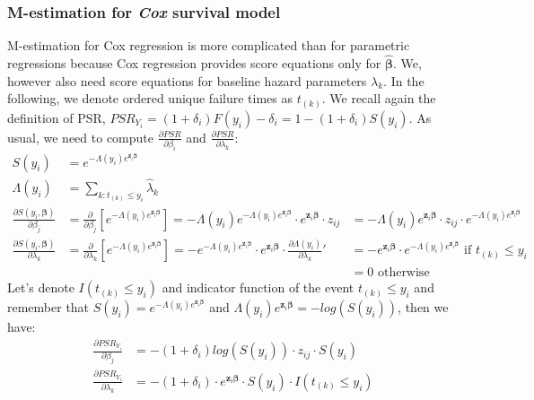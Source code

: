 \documentclass[]{article}
\begin{document}
\subsubsection{M-estimation for \emph{Cox} survival model}
M-estimation for Cox regression is more complicated than for parametric regressions because Cox regression provides score equations only for $\hat{\pmb{\beta}}$. We, however also need score equations for baseline hazard parameters $\lambda_k$. In the following, we denote ordered unique failure times as $t_{(k)}$. We recall again the definition of PSR, $PSR_{Y_i} =  (1+\delta_i) F(y_i)  -  \delta_i = 1- (1+\delta_i) S(y_i)$. 
As usual, we need to compute $\frac{\partial PSR}{\partial \beta_i}$ and $\frac{\partial PSR}{\partial \lambda_k}$:
$$
  \begin{aligned}
    S(y_i) &=  e^{-\Lambda(y_i) e^{\pmb{z}_i\pmb{\beta}}} \\
    \Lambda(y_i)  &= \sum_{k: t_{(k)}\leq y_i} \hat{\lambda}_k\\
    \frac{\partial S(y_i, \pmb{\beta})}{\partial \beta_j} &= \frac{\partial}{\partial \beta_j}\left[  e^{-\Lambda(y_i) e^{\pmb{z}_i\pmb{\beta}}}  \right] =   -\Lambda(y_i)e^{-\Lambda(y_i) e^{\pmb{z}_i\pmb{\beta}}}  \cdot  e^{\pmb{z}_i\pmb{\beta}}   \cdot z_{ij} &=  -\Lambda(y_i) e^{\pmb{z}_i\pmb{\beta}}   \cdot  z_{ij}  \cdot  e^{-\Lambda(y_i) e^{\pmb{z}_i\pmb{\beta}}} \\
    \frac{\partial S(y_i, \pmb{\beta})}{\partial \lambda_k} &= \frac{\partial}{\partial \lambda_k}\left[  e^{-\Lambda(y_i) e^{\pmb{z}_i\pmb{\beta}}}  \right] =   -e^{-\Lambda(y_i) e^{\pmb{z}_i\pmb{\beta}}}  \cdot  e^{\pmb{z}_i\pmb{\beta}}\cdot \frac{\partial \Lambda(y_i)}{\partial \lambda_k}' &=   -e^{\pmb{z}_i\pmb{\beta}}   \cdot  e^{-\Lambda(y_i) e^{\pmb{z}_i\pmb{\beta}}}\text{ if } t_{(k)}\leq y_i\\
    & & = 0\text{ otherwise}
  \end{aligned}
  $$
Let's denote $I(t_{(k)}\leq y_i)$ and indicator function of the event $t_{(k)}\leq y_i$ and remember that $S(y_i) =  e^{-\Lambda(y_i) e^{\pmb{z}_i\pmb{\beta}}}$ and $\Lambda(y_i) e^{\pmb{z}_i\pmb{\beta}} = -log\left(S(y_i)\right)$, then we have:
$$
  \begin{aligned}
    \frac{\partial PSR_{Y_i}}{\partial \beta_j} &=  -(1+\delta_i)log\left(S(y_i)\right) \cdot  z_{ij}  \cdot  S(y_i)\\
    \frac{\partial PSR_{Y_i}}{\partial \lambda_k} &=  -(1+\delta_i)\cdot  e^{\pmb{z}_i\pmb{\beta}}   \cdot  S(y_i) \cdot I(t_{(k)}\leq y_i)
  \end{aligned}
  $$
\end{document}
